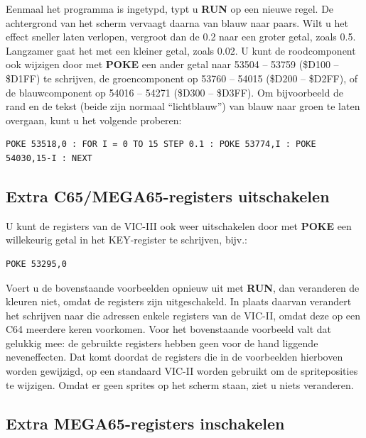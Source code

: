 Eenmaal het programma is ingetypd, typt u {\bf RUN} op een nieuwe regel. De achtergrond van het scherm vervaagt daarna van blauw naar paars. Wilt u het effect sneller laten verlopen, vergroot dan de 0.2 naar een groter getal, zoals 0.5. Langzamer gaat het met een kleiner getal, zoals 0.02. U kunt de roodcomponent ook wijzigen door met {\bf POKE} een ander getal naar 53504 – 53759 (\$D100 – \$D1FF) te schrijven, de groencomponent op 53760 -- 54015 (\$D200 -- \$D2FF), of de blauwcomponent op 54016 -- 54271 (\$D300 -- \$D3FF). Om bijvoorbeeld de rand en de tekst (beide zijn normaal ``lichtblauw'') van blauw naar groen te laten overgaan, kunt u het volgende proberen:

\begin{tcolorbox}[colback=black,coltext=white]
\verbatimfont{\codefont}
\begin{verbatim}
POKE 53518,0 : FOR I = 0 TO 15 STEP 0.1 : POKE 53774,I : POKE 54030,15-I : NEXT
\end{verbatim}
\end{tcolorbox}

\subsection{Extra C65/MEGA65-registers uitschakelen}

U kunt de registers van de VIC-III ook weer uitschakelen door met {\bf POKE} een willekeurig getal in het KEY-register te schrijven, bijv.:

\begin{tcolorbox}[colback=black,coltext=white]
\verbatimfont{\codefont}
\begin{verbatim}
POKE 53295,0
\end{verbatim}
\end{tcolorbox}

Voert u de bovenstaande voorbeelden opnieuw uit met {\bf RUN}, dan veranderen de kleuren niet, omdat de registers zijn uitgeschakeld. In plaats daarvan verandert het schrijven naar die adressen enkele registers van de VIC-II, omdat deze op een C64 meerdere keren voorkomen. Voor het bovenstaande voorbeeld valt dat gelukkig mee: de gebruikte registers hebben geen voor de hand liggende neveneffecten. Dat komt doordat de registers die in de voorbeelden hierboven worden gewijzigd, op een standaard VIC-II worden gebruikt om de spriteposities te wijzigen. Omdat er geen sprites op het scherm staan, ziet u niets veranderen.

\subsection{Extra MEGA65-registers inschakelen}


